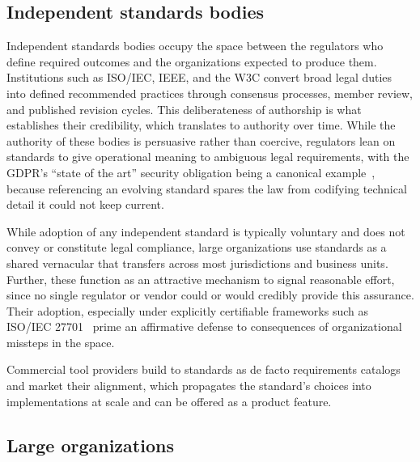 \documentclass[10pt,letterpaper,twocolumn,twoside]{rho-class/rho}
\begin{document}
\subsection{Independent standards bodies}\label{sec:standards}

Independent standards bodies occupy the space between the regulators who define required outcomes and the organizations expected to produce them. Institutions such as ISO/IEC, IEEE, and the W3C convert broad legal duties into defined recommended practices through consensus processes, member review, and published revision cycles. This deliberateness of authorship is what establishes their credibility, which translates to authority over time. While the authority of these bodies is persuasive rather than coercive, regulators lean on standards to give operational meaning to ambiguous legal requirements, with the GDPR's ``state of the art'' security obligation being a canonical example~\cite{gdpr}, because referencing an evolving standard spares the law from codifying technical detail it could not keep current. 

While adoption of any independent standard is typically voluntary and does not convey or constitute legal compliance, large organizations use standards as a shared vernacular that transfers across most jurisdictions and business units. Further, these function as an attractive mechanism to signal reasonable effort, since no single regulator or vendor could or would credibly provide this assurance. Their adoption, especially under explicitly certifiable frameworks such as ISO/IEC 27701~\cite{iso27701} prime an affirmative defense to consequences of organizational missteps in the space.

Commercial tool providers build to standards as de facto requirements catalogs and market their alignment, which propagates the standard's choices into implementations at scale and can be offered as a product feature.

\subsection{Large organizations}\label{sec:largeorgs}
\end{document}
